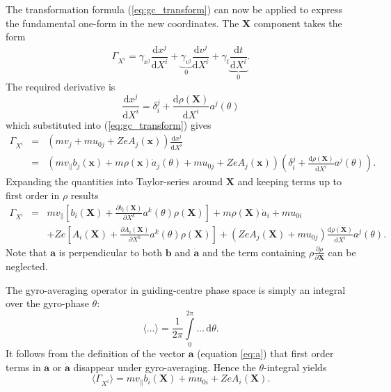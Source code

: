 \documentclass[a4paper,10pt]{article}
\renewcommand{\vec}[1]{\mathbf{#1}}
\begin{document}
The transformation formula (\ref{eq:gc_transform}) can now be applied to express the fundamental one-form in the new coordinates. The $\vec{X}$ component takes the form
\[ \Gamma_{X^i} = \gamma_{x^j} \frac{\mathrm{d} x^j}{\mathrm{d} X^i} + \underbrace{\gamma_{v^j}}_{0} \frac{\mathrm{d} v^j}{\mathrm{d} X^i} + \gamma_t \underbrace{\frac{\mathrm{d} t}{\mathrm{d} X^i}}_{0}. \]
The required derivative is
\[\frac{\mathrm{d} x^j}{\mathrm{d} X^i} = \delta^j_i + \frac{\mathrm{d} \rho(\mathbf{X})}{\mathrm{d}X^i} a^j(\theta) \]
which substituted into (\ref{eq:gc_transform}) gives
\begin{eqnarray*}
	\Gamma_{X^i} &=& \left( m v_j + m u_{0j} + Z e A_j(\mathbf{x}) \right) \frac{\mathrm{d} x^j}{\mathrm{d} X^i} \\
	&=& \left( m v_{\parallel} b_j(\mathbf{x}) + m \rho(\mathbf{x}) \dot{a}_j(\theta) + m u_{0j} + Z e A_j(\mathbf{x})\right) \left( \delta^j_i + \frac{\mathrm{d} \rho(\mathbf{X})}{\mathrm{d}X^i} a^j(\theta) \right). %
\end{eqnarray*}
Expanding the quantities into Taylor-series around $\vec{X}$ and keeping terms up to first order in $\rho$ results
\begin{eqnarray*}
	\Gamma_{X^i} &=& m v_{\parallel} \left[ b_i(\mathbf{X}) + \frac{\partial b_i(\mathbf{X})}{\partial X^k} a^k(\theta) \rho(\mathbf{X}) \right] + m \rho(\mathbf{X}) \dot{a}_i + m u_{0i}\\
	&& + Z e \left[ A_i(\mathbf{X}) + \frac{\partial A_i(\mathbf{X})}{\partial X^k} a^k(\theta) \rho(\mathbf{X}) \right] + (Z e A_j(\mathbf{X}) + m u_{0j}) \frac{\mathrm{d} \rho(\mathbf{X})}{\mathrm{d} X^i} a^j(\theta).
\end{eqnarray*}
Note that $\mathbf{a}$ is perpendicular to both $\mathbf{b}$ and $\dot{\mathbf{a}}$ and the term containing $\rho \frac{\partial \rho}{\partial \vec{X}}$ can be neglected. 

The gyro-averaging operator in guiding-centre phase space is simply an integral over the gyro-phase $\theta$:
\begin{equation}
	\langle \dots \rangle = \frac{1}{2 \pi} \int \limits_0^{2 \pi} \dots \, \mathrm{d} \theta.
\end{equation}
It follows from the definition of the vector $\mathbf{a}$ (equation \ref{eq:a}) that first order terms in $\mathbf{a}$ or $\dot{\mathbf{a}}$ disappear under gyro-averaging. Hence the $\theta$-integral yields
\begin{equation}
	\langle \Gamma_{X^i} \rangle = m v_{\parallel} b_i(\mathbf{X}) + m u_{0i} + Z e A_i(\mathbf{X}).
	\label{eq:gc_X}
\end{equation}
\end{document}
